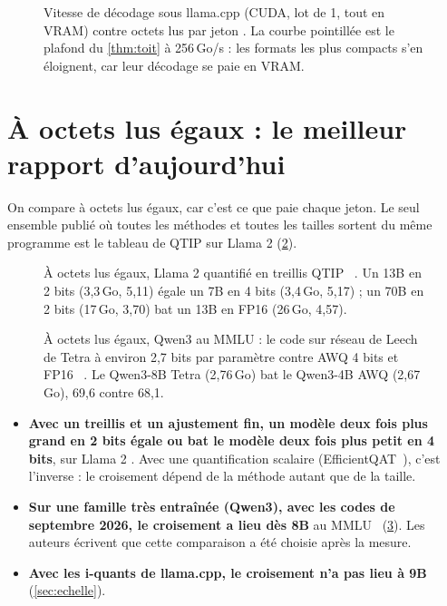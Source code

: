 \begin{figure}[ht]
\centering
\GrapheVitesseQuant
\caption[Vitesse de décodage contre octets lus par jeton]{Vitesse de décodage sous llama.cpp (CUDA, lot de 1, tout en VRAM) contre octets lus par jeton \mes. La courbe pointillée est le plafond du \cref{thm:toit} à 256\,Go/s : les formats les plus compacts s'en éloignent, car leur décodage se paie en VRAM.}
\label{fig:vitesse-quant}
\end{figure}

\section{À octets lus égaux : le meilleur rapport d'aujourd'hui}\label{sec:iso-octets}

On compare à octets lus égaux, car c'est ce que paie chaque jeton. Le seul ensemble publié où toutes les méthodes et toutes les tailles sortent du même programme est le tableau de QTIP sur Llama 2 (\cref{fig:iso-octets}).

\begin{figure}[ht]
\centering
\GrapheIsoOctets
\caption[À octets égaux : Llama 2 en treillis]{À octets lus égaux, Llama 2 quantifié en treillis QTIP \litt~\calc. Un 13B en 2 bits (3,3\,Go, 5,11) égale un 7B en 4 bits (3,4\,Go, 5,17) ; un 70B en 2 bits (17\,Go, 3,70) bat un 13B en FP16 (26\,Go, 4,57).}
\label{fig:iso-octets}
\end{figure}

\begin{figure}[ht]
\centering
\GrapheMMLU
\caption[À octets égaux : Qwen3 au MMLU]{À octets lus égaux, Qwen3 au MMLU : le code sur réseau de Leech de Tetra à environ 2,7 bits par paramètre contre AWQ 4 bits et FP16 \litt~\calc. Le Qwen3-8B Tetra (2,76\,Go) bat le Qwen3-4B AWQ (2,67\,Go), 69,6 contre 68,1.}
\label{fig:mmlu}
\end{figure}

\begin{itemize}
\item \textbf{Avec un treillis et un ajustement fin, un modèle deux fois plus grand en 2 bits égale ou bat le modèle deux fois plus petit en 4 bits}, sur Llama 2 \litt. Avec une quantification scalaire (EfficientQAT~\cite{efficientqat2024}), c'est l'inverse : le croisement dépend de la méthode autant que de la taille.
\item \textbf{Sur une famille très entraînée (Qwen3), avec les codes de septembre 2026, le croisement a lieu dès 8B} au MMLU~\cite{tetra2026} (\cref{fig:mmlu}). Les auteurs écrivent que cette comparaison a été choisie après la mesure.
\item \textbf{Avec les i-quants de llama.cpp, le croisement n'a pas lieu à 9B} (\cref{sec:echelle}).
\end{itemize}

